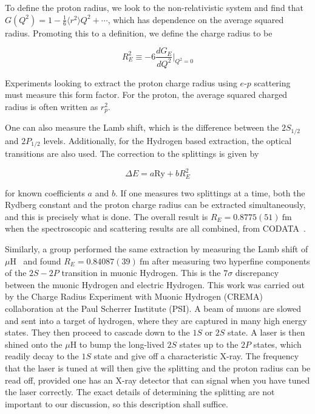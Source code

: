 To define the proton radius, we look to the non-relativistic system and find that $G(Q^2) = 1 - \frac{1}{6}\langle r^2 \rangle Q^2 + \cdots$, which has dependence on the average squared radius.
Promoting this to a definition, we define the charge radius to be

\begin{equation}
    R_E^2 \equiv -6 \frac{d G_E}{d Q^2}\rvert_{Q^2=0}
\end{equation}

\noindent Experiments looking to extract the proton charge radius using $e\textrm{-}p$ scattering must measure this form factor.
For the proton, the average squared charged radius is often written as $r_p^2$.

One can also measure the Lamb shift, which is the difference between the $2S_{1/2}$ and $2P_{1/2}$ levels.
Additionally, for the Hydrogen based extraction, the optical transitions are also used.
The correction to the splittings is given by

\begin{equation}
    \Delta E = a \textrm{Ry} + b R_E^2
\end{equation}

\noindent for known coefficients $a$ and $b$.
If one measures two splittings at a time, both the Rydberg constant and the proton charge radius can be extracted simultaneously, and this is precisely what is done.
The overall result is $R_E = 0.8775(51)~\textrm{fm}$ when the spectroscopic and scattering results are all combined, from CODATA~\cite{Mohr:2012tt}.

Similarly, a group performed the same extraction by measuring the Lamb shift of $\mu\textrm{H}$~\cite{Pohl:2010zza,Antognini:1900ns} and found $R_E = 0.84087(39)~\textrm{fm}$ after measuring two hyperfine components of the $2S-2P$ transition in muonic Hydrogen.
This is the $7\sigma$ discrepancy between the muonic Hydrogen and electric Hydrogen.
This work was carried out by the Charge Radius Experiment with Muonic Hydrogen (CREMA) collaboration at the Paul Scherrer Institute (PSI).
A beam of muons are slowed and sent into a target of hydrogen, where they are captured in many high energy states.
They then proceed to cascade down to the $1S$ or $2S$ state.
A laser is then shined onto the $\mu\textrm{H}$ to bump the long-lived $2S$ states up to the $2P$ states, which readily decay to the $1S$ state and give off a characteristic X-ray.
The frequency that the laser is tuned at will then give the splitting and the proton radius can be read off, provided one has an X-ray detector that can signal when you have tuned the laser correctly.
The exact details of determining the splitting are not important to our discussion, so this description shall suffice.

